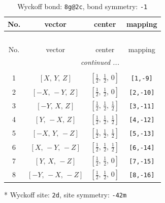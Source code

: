 \documentclass[fleqn,8pt]{jsarticle}
\begin{document}
\renewcommand{\arraystretch}{1.2}
\begin{longtable}{cccc}
\caption{Wyckoff bond: {\tt 8g@2c}, bond symmetry: {\tt -1}}
 \\
 \hline \hline
No. & vector & center & mapping \\ \hline \endfirsthead

\multicolumn{3}{l}{\tablename\ \thetable{}} \\
 \hline \hline
No. & vector & center & mapping \\ \hline \endhead

 \hline \hline
\multicolumn{3}{r}{\footnotesize\it continued ...} \\ \endfoot

 \hline \hline
\multicolumn{3}{r}{} \\ \endlastfoot

1 & $\left[ X,\, Y,\, Z \right]$ & $\left[ \frac{1}{2},\, \frac{1}{2},\, 0 \right]$ & {\tt [1,-9]} \\ \hline
2 & $\left[ - X,\, - Y,\, Z \right]$ & $\left[ \frac{1}{2},\, \frac{1}{2},\, 0 \right]$ & {\tt [2,-10]} \\ \hline
3 & $\left[ - Y,\, X,\, Z \right]$ & $\left[ \frac{1}{2},\, \frac{1}{2},\, \frac{1}{2} \right]$ & {\tt [3,-11]} \\ \hline
4 & $\left[ Y,\, - X,\, Z \right]$ & $\left[ \frac{1}{2},\, \frac{1}{2},\, \frac{1}{2} \right]$ & {\tt [4,-12]} \\ \hline
5 & $\left[ - X,\, Y,\, - Z \right]$ & $\left[ \frac{1}{2},\, \frac{1}{2},\, \frac{1}{2} \right]$ & {\tt [5,-13]} \\ \hline
6 & $\left[ X,\, - Y,\, - Z \right]$ & $\left[ \frac{1}{2},\, \frac{1}{2},\, \frac{1}{2} \right]$ & {\tt [6,-14]} \\ \hline
7 & $\left[ Y,\, X,\, - Z \right]$ & $\left[ \frac{1}{2},\, \frac{1}{2},\, 0 \right]$ & {\tt [7,-15]} \\ \hline
8 & $\left[ - Y,\, - X,\, - Z \right]$ & $\left[ \frac{1}{2},\, \frac{1}{2},\, 0 \right]$ & {\tt [8,-16]} \\
\end{longtable}
* Wyckoff site: {\tt 2d}, site symmetry: {\tt -42m}
\renewcommand{\arraystretch}{1.2}
\end{document}
